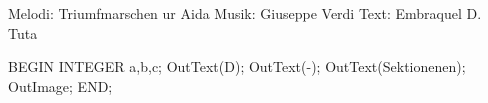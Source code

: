 \begin{song}


\begin{songmeta}
Melodi: Triumfmarschen ur Aida
Musik: Giuseppe Verdi
Text: Embraquel D. Tuta
\end{songmeta}

\begin{songtext}
BEGIN
INTEGER a,b,c;
OutText(D);
OutText(-);
OutText(Sektionenen); OutImage;
END;
\end{songtext}

\begin{songnotes}
\end{songnotes}

\end{song}
